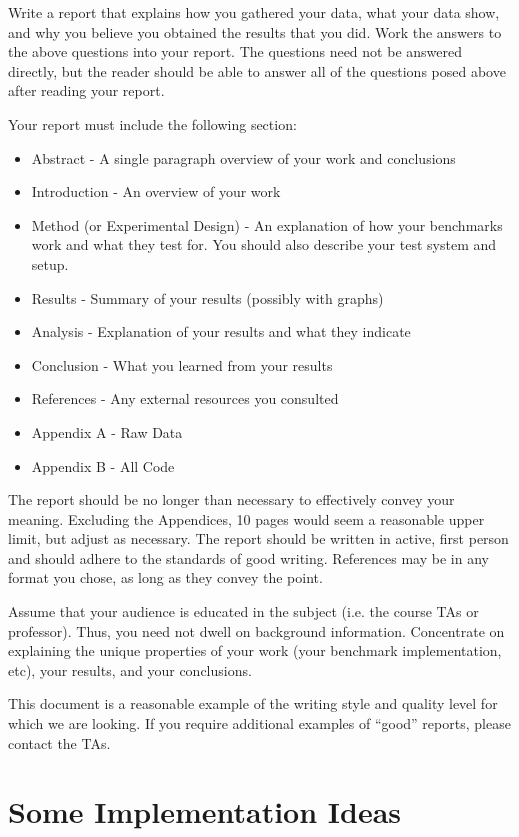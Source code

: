 \documentclass[12pt]{article}
\begin{document}
Write a report that explains how you gathered your data, what your
data show, and why you believe you obtained the results that you did. Work
the answers to the above questions into your report. The questions
need not be answered directly, but the reader should be able to answer
all of the questions posed above after reading your report.

Your report must include the following section:

\begin{itemize}
\item Abstract - A single paragraph overview of your work and conclusions
\item Introduction - An overview of your work
\item Method (or Experimental Design) - An explanation of how your
benchmarks work and what they test for. You should also describe your
test system and setup.
\item Results - Summary of your results (possibly with graphs)
\item Analysis - Explanation of your results and what they indicate
\item Conclusion - What you learned from your results
\item References - Any external resources you consulted
\item Appendix A - Raw Data
\item Appendix B - All Code
\end{itemize}

The report should be no longer than necessary to effectively convey your
meaning. Excluding the Appendices, 10 pages would seem a reasonable
upper limit, but adjust as necessary. The report should be written in
active, first person and should adhere to the standards of good
writing. References may be in any format you chose, as long as they
convey the point.

Assume that your audience is educated in the subject
(i.e. the course TAs or professor). Thus, you need not dwell on
background information. Concentrate on explaining the unique properties of
your work (your benchmark implementation, etc), your results, and your
conclusions.

This document is a reasonable example of the writing
style and quality level for which we are looking. If you require
additional examples of ``good'' reports, please contact the TAs.

\section{Some Implementation Ideas}
\end{document}
